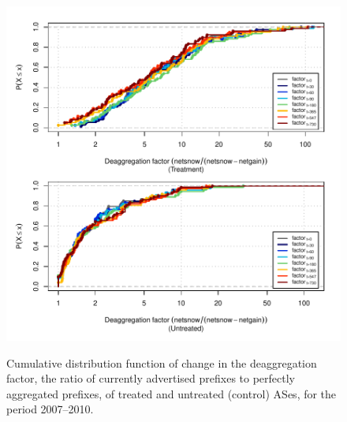 \begin{figure}[H]
\begin{centering}
\begin{singlespace}
    \includegraphics[width=6in]
    {figures/behavior-deagg_factor-2007_2010-corr.pdf}
    \vspace{-2em}\\
    \caption{Cumulative distribution function of change in the deaggregation
    factor, the ratio of currently advertised prefixes to perfectly aggregated
    prefixes, of treated and untreated (control) ASes, for the period
    2007--2010.}
\end{singlespace}
\end{centering}
\end{figure}
